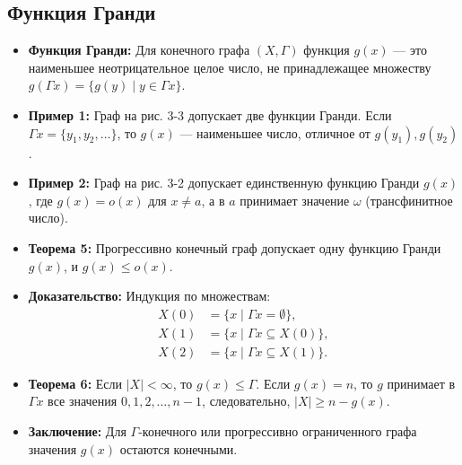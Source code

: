 \subsection{Функция Гранди}

\begin{itemize}
    \item \textbf{Функция Гранди:} Для конечного графа $(X, \Gamma)$ функция $g(x)$ — это наименьшее неотрицательное целое число, не принадлежащее множеству $g(\Gamma x) = \{g(y) \mid y \in \Gamma x\}$.
    \item \textbf{Пример 1:} Граф на рис. 3-3 допускает две функции Гранди. Если $\varGamma x = \{y_1, y_2, \ldots\}$, то $g(x)$ — наименьшее число, отличное от $g(y_1), g(y_2)$.
    \item \textbf{Пример 2:} Граф на рис. 3-2 допускает единственную функцию Гранди $g(x)$, где $g(x) = o(x)$ для $x \neq a$, а в $a$ принимает значение $\omega$ (трансфинитное число).
    \item \textbf{Теорема 5:} Прогрессивно конечный граф допускает одну функцию Гранди $g(x)$, и $g(x) \leq o(x)$.
    \item \textbf{Доказательство:} Индукция по множествам:
    \begin{align*}
        X(0) &= \{x \mid \varGamma x = \emptyset\}, \\
        X(1) &= \{x \mid \varGamma x \subseteq X(0)\}, \\
        X(2) &= \{x \mid \varGamma x \subseteq X(1)\}.
    \end{align*}
    \item \textbf{Теорема 6:} Если $|X| < \infty$, то $g(x) \leq \Gamma$. Если $g(x) = n$, то $g$ принимает в $\varGamma x$ все значения $0, 1, 2, \ldots, n-1$, следовательно, $|X| \geq n - g(x)$.
    \item \textbf{Заключение:} Для $\Gamma$-конечного или прогрессивно ограниченного графа значения $g(x)$ остаются конечными.
\end{itemize}